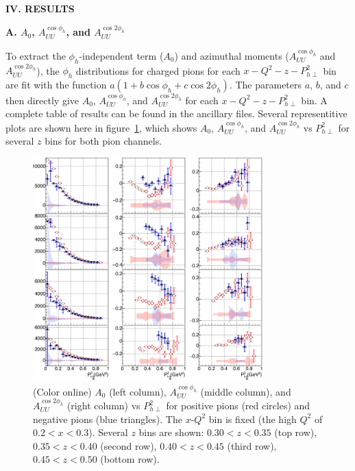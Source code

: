 \documentclass[aps,prl,twocolumn,showpacs,superscriptaddress,groupedaddress]{revtex4-1}  %
\begin{document}
\begin{center}
\textbf{IV. RESULTS} \par
\end{center}
\begin{center}
\textbf{A. $A_0$, $A_{UU}^{\cos\phi_h}$, and $A_{UU}^{\cos 2\phi_h}$} \par
\end{center}
To extract the $\phi_h$-independent term ($A_0$) and azimuthal moments ($A_{UU}^{\cos\phi_h}$ and $A_{UU}^{\cos 2\phi_h}$), the $\phi_h$ distributions for charged pions for each $x-Q^2-z-P_{h\perp}^2$ bin are fit with the function $a(1 + b\cos\phi_h + c\cos 2\phi_h)$.
The parameters $a$, $b$, and $c$ then directly give $A_0$, $A_{UU}^{\cos\phi_h}$, and $A_{UU}^{\cos 2\phi_h}$ for each $x-Q^2-z-P_{h\perp}^2$ bin.
A complete table of results can be found in the ancillary files.
Several representitive plots are shown here in figure~\ref{fig:A0AcAcc_zPT2bins_x1QQ1_final}, which shows $A_0$, $A_{UU}^{\cos\phi_h}$, and $A_{UU}^{\cos 2\phi_h}$ vs $P_{h\perp}^2$ for several $z$ bins for both pion channels.
%
\begin{figure}[htp]
\centering
\includegraphics[width=3.5in]{plots/A0AcAcc_zPT2bins_x1QQ1_final.png}
\caption{(Color online) $A_0$ (left column), $A_{UU}^{\cos\phi_h}$ (middle column), and $A_{UU}^{\cos 2\phi_h}$ (right column) vs $P_{h\perp}^2$ for positive pions (red circles) and negative pions (blue triangles). The $x$-$Q^2$ bin is fixed (the high $Q^2$ of $0.2 < x < 0.3$). Several $z$ bins are shown: $0.30 < z < 0.35$ (top row), $0.35 < z < 0.40$ (second row), $0.40 < z < 0.45$ (third row), $0.45 < z < 0.50$ (bottom row).}
\label{fig:A0AcAcc_zPT2bins_x1QQ1_final}
\end{figure}
\end{document}
